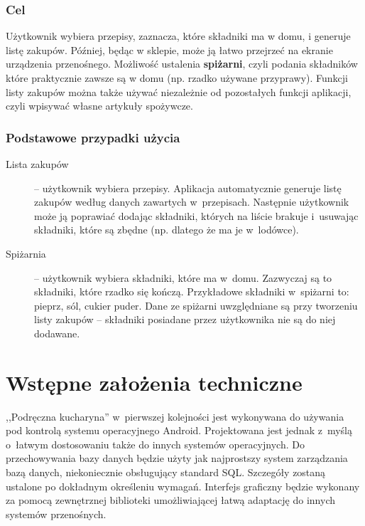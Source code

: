 \documentclass[a4paper,11pt,titlepage,twoside]{mwart}
\begin{document}
\subsubsection{Cel}
Użytkownik wybiera przepisy, zaznacza, które składniki ma w domu, i generuje listę zakupów. Później, będąc w sklepie, może ją łatwo przejrzeć na ekranie urządzenia przenośnego. Możliwość ustalenia \textbf{spiżarni}, czyli podania składników które praktycznie zawsze są w domu (np. rzadko używane przyprawy). Funkcji listy zakupów można także używać niezależnie od pozostałych funkcji aplikacji, czyli wpisywać własne artykuły spożywcze.
\subsubsection{Podstawowe przypadki użycia}
\begin{description}
  \item[Lista zakupów] -- użytkownik wybiera przepisy. Aplikacja automatycznie generuje listę zakupów według danych zawartych w~przepisach. Następnie użytkownik może ją poprawiać dodając składniki, których na liście brakuje i~usuwając składniki, które są zbędne (np. dlatego że ma je w~lodówce).
  \item[Spiżarnia] -- użytkownik wybiera składniki, które ma w~domu. Zazwyczaj są to składniki, które rzadko się kończą. Przykładowe składniki w~spiżarni to: pieprz, sól, cukier puder. Dane ze spiżarni uwzględniane są przy tworzeniu listy zakupów -- składniki posiadane przez użytkownika nie są do niej dodawane.
\end{description}
\section{Wstępne założenia techniczne}
,,Podręczna kucharyna'' w~pierwszej kolejności jest wykonywana do używania pod kontrolą systemu operacyjnego Android. Projektowana jest jednak z~myślą o~łatwym dostosowaniu także do innych systemów operacyjnych.
Do przechowywania bazy danych będzie użyty jak najprostszy system zarządzania bazą danych, niekoniecznie obsługujący standard SQL. Szczegóły zostaną ustalone po dokładnym określeniu wymagań. Interfejs graficzny będzie wykonany za pomocą zewnętrznej biblioteki umożliwiającej łatwą adaptację do innych systemów przenośnych.
\end{document}

